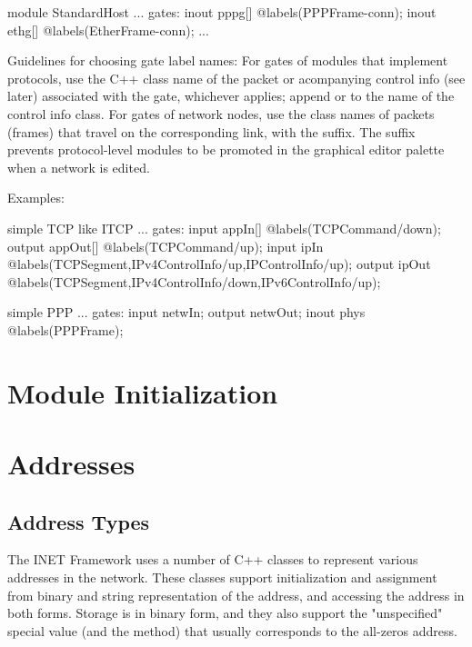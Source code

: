 \begin{ned}
module StandardHost
{
    ...
    gates:
        inout pppg[] @labels(PPPFrame-conn);
        inout ethg[] @labels(EtherFrame-conn);
    ...
}
\end{ned}

Guidelines for choosing gate label names: For gates of modules that
implement protocols, use the C++ class name of the packet or acompanying
control info (see later) associated with the gate, whichever applies;
append  or  to the name of the control info class. For
gates of network nodes, use the class names of packets (frames) that travel
on the corresponding link, with the  suffix. The suffix prevents
protocol-level modules to be promoted in the graphical editor palette when
a network is edited.

Examples:

\begin{ned}
simple TCP like ITCP
{
    ...
    gates:
        input appIn[] @labels(TCPCommand/down);
        output appOut[] @labels(TCPCommand/up);
        input ipIn @labels(TCPSegment,IPv4ControlInfo/up,IPControlInfo/up);
        output ipOut @labels(TCPSegment,IPv4ControlInfo/down,IPv6ControlInfo/up);
}
\end{ned}


\begin{ned}
simple PPP
{
    ...
    gates:
        input netwIn;
        output netwOut;
        inout phys @labels(PPPFrame);
}
\end{ned}


\section{Module Initialization}




\section{Addresses}

\subsection{Address Types}

The INET Framework uses a number of C++ classes to represent various
addresses in the network. These classes support initialization and
assignment from binary and string representation of the address, and
accessing the address in both forms. Storage is in binary form, and they also
support the "unspecified" special value (and the 
method) that usually corresponds to the all-zeros address.

